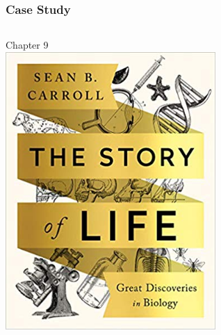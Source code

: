 \documentclass[10pt]{beamer}
\begin{document}
\begin{frame}[t]
\frametitle{Case Study}
\vspace{0.5cm}

	\begin{columns}[t]
		\begin{column}{0.5\textwidth}
			\begin{center}
				Chapter 9\\
				\vspace{0.25cm}
				\includegraphics[width=0.6\textwidth]{../Topic1-Introduction/figures/carroll.jpg}
			\end{center}
		\end{column}
		

\end{columns}
\end{frame}
\end{document}
